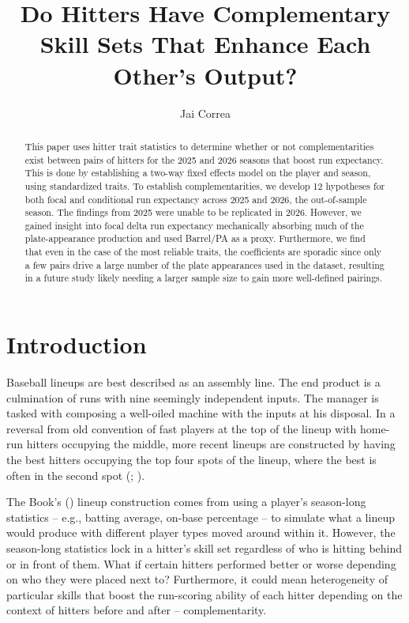 \documentclass{article}
\title{Do Hitters Have Complementary Skill Sets That Enhance Each Other's Output?}
\author{Jai Correa}
\begin{document}
\doublespacing
\maketitle

\begin{abstract}
This paper uses hitter trait statistics to determine whether or not complementarities exist between pairs of hitters for the 2025 and 2026 seasons that boost run expectancy. This is done by establishing a two-way fixed effects model on the player and season, using standardized traits. To establish complementarities, we develop 12 hypotheses for both focal and conditional run expectancy across 2025 and 2026, the out-of-sample season. The findings from 2025 were unable to be replicated in 2026. However, we gained insight into focal delta run expectancy mechanically absorbing much of the plate-appearance production and used Barrel/PA as a proxy. Furthermore, we find that even in the case of the most reliable traits, the coefficients are sporadic since only a few pairs drive a large number of the plate appearances used in the dataset, resulting in a future study likely needing a larger sample size to gain more well-defined pairings.
\end{abstract}
\newpage
\section{Introduction}

Baseball lineups are best described as an assembly line. The end product is a culmination of runs with nine seemingly independent inputs. The manager is tasked with composing a well-oiled machine with the inputs at his disposal. In a reversal from old convention of fast players at the top of the lineup with home-run hitters occupying the middle, more recent lineups are constructed by having the best hitters occupying the top four spots of the lineup, where the best is often in the second spot (\cite{tango2007book}; \cite{bukiet1997markov}).

The Book's (\cite{tango2007book}) lineup construction comes from using a player's season-long statistics -- e.g., batting average, on-base percentage -- to simulate what a lineup would produce with different player types moved around within it. However, the season-long statistics lock in a hitter's skill set regardless of who is hitting behind or in front of them. What if certain hitters performed better or worse depending on who they were placed next to? Furthermore, it could mean heterogeneity of particular skills that boost the run-scoring ability of each hitter depending on the context of hitters before and after -- complementarity.
\end{document}
